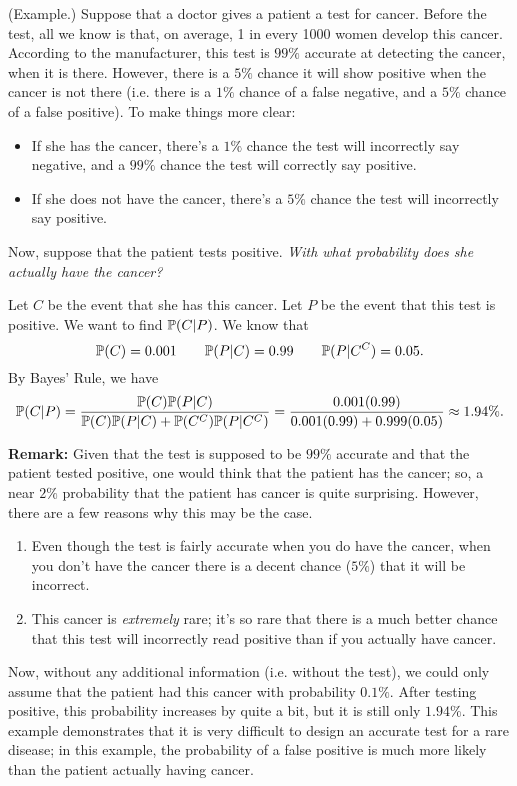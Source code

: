 \documentclass[letterpaper]{article}
\begin{document}
\begin{mdframed}[]
    (Example.) Suppose that a doctor gives a patient a test for cancer. Before the test, all we know is that, on average, 1 in every 1000 women develop this cancer. According to the manufacturer, this test is $99\%$ accurate at detecting the cancer, when it is there. However, there is a $5\%$ chance it will show positive when the cancer is not there (i.e. there is a $1\%$ chance of a false negative, and a $5\%$ chance of a false positive). To make things more clear:
    \begin{itemize}
        \item If she has the cancer, there's a $1\%$ chance the test will incorrectly say negative, and a $99\%$ chance the test will correctly say positive. 
        \item If she does not have the cancer, there's a $5\%$ chance the test will incorrectly say positive.
    \end{itemize}
    Now, suppose that the patient tests positive. \emph{With what probability does she actually have the cancer?}

    \begin{mdframed}[]
        Let $C$ be the event that she has this cancer. Let $P$ be the event that this test is positive. We want to find $\mathbb{P}(C | P)$. We know that 
        \[\mathbb{P}(C) = 0.001 \qquad \mathbb{P}(P | C) = 0.99 \qquad \mathbb{P}(P | C^C) = 0.05.\]
        By Bayes' Rule, we have 
        \[\mathbb{P}(C | P) = \frac{\mathbb{P}(C) \mathbb{P}(P | C)}{\mathbb{P}(C) \mathbb{P}(P | C) + \mathbb{P}(C^C) \mathbb{P}(P | C^C)} = \frac{0.001(0.99)}{0.001(0.99) + 0.999(0.05)} \approx 1.94\%.\]
    \end{mdframed}
\end{mdframed}
\textbf{Remark:} Given that the test is supposed to be $99\%$ accurate and that the patient tested positive, one would think that the patient has the cancer; so, a near $2\%$ probability that the patient has cancer is quite surprising. However, there are a few reasons why this may be the case.
\begin{enumerate}
    \item Even though the test is fairly accurate when you do have the cancer, when you don't have the cancer there is a decent chance ($5\%$) that it will be incorrect.
    \item This cancer is \emph{extremely} rare; it's so rare that there is a much better chance that this test will incorrectly read positive than if you actually have cancer. 
\end{enumerate}
Now, without any additional information (i.e. without the test), we could only assume that the patient had this cancer with probability $0.1\%$. After testing positive, this probability increases by quite a bit, but it is still only $1.94\%$. This example demonstrates that it is very difficult to design an accurate test for a rare disease; in this example, the probability of a false positive is much more likely than the patient actually having cancer.

\end{document}
